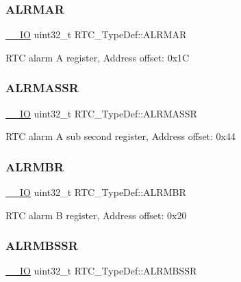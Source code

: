 \subsubsection{\texorpdfstring{A\+L\+R\+M\+AR}{ALRMAR}}
{\footnotesize\ttfamily \hyperlink{core__sc300_8h_aec43007d9998a0a0e01faede4133d6be}{\+\_\+\+\_\+\+IO} uint32\+\_\+t R\+T\+C\+\_\+\+Type\+Def\+::\+A\+L\+R\+M\+AR}

R\+TC alarm A register, Address offset\+: 0x1C \mbox{\label{struct_r_t_c___type_def_ac5b2e3c0dcdcb569f3fe15dfe3794bc1}} 
\subsubsection{\texorpdfstring{A\+L\+R\+M\+A\+S\+SR}{ALRMASSR}}
{\footnotesize\ttfamily \hyperlink{core__sc300_8h_aec43007d9998a0a0e01faede4133d6be}{\+\_\+\+\_\+\+IO} uint32\+\_\+t R\+T\+C\+\_\+\+Type\+Def\+::\+A\+L\+R\+M\+A\+S\+SR}

R\+TC alarm A sub second register, Address offset\+: 0x44 \mbox{\label{struct_r_t_c___type_def_a9816616e1f00955c8982469d0dd9c953}} 
\subsubsection{\texorpdfstring{A\+L\+R\+M\+BR}{ALRMBR}}
{\footnotesize\ttfamily \hyperlink{core__sc300_8h_aec43007d9998a0a0e01faede4133d6be}{\+\_\+\+\_\+\+IO} uint32\+\_\+t R\+T\+C\+\_\+\+Type\+Def\+::\+A\+L\+R\+M\+BR}

R\+TC alarm B register, Address offset\+: 0x20 \mbox{\label{struct_r_t_c___type_def_a249009cd672e7bcd52df1a41de4619e1}} 
\subsubsection{\texorpdfstring{A\+L\+R\+M\+B\+S\+SR}{ALRMBSSR}}
{\footnotesize\ttfamily \hyperlink{core__sc300_8h_aec43007d9998a0a0e01faede4133d6be}{\+\_\+\+\_\+\+IO} uint32\+\_\+t R\+T\+C\+\_\+\+Type\+Def\+::\+A\+L\+R\+M\+B\+S\+SR}

